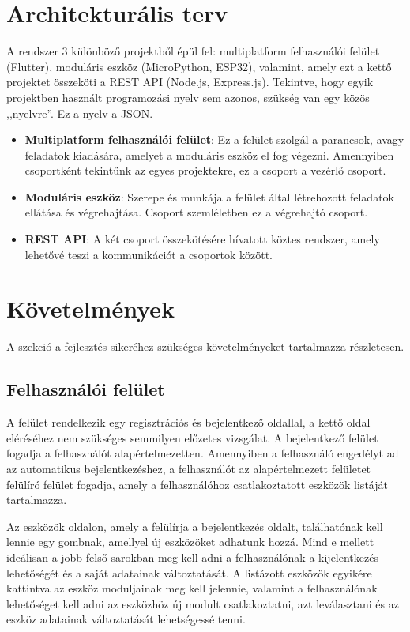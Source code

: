 \documentclass{thesis-ekf}
\theoremstyle{definition}
\theoremstyle{remark}
\begin{document}
	\section{Architekturális terv}
	A rendszer 3 különböző projektből épül fel: multiplatform felhasználói felület (Flutter), moduláris eszköz (MicroPython, ESP32), valamint, amely ezt a kettő projektet összeköti a REST API (Node.js, Express.js). Tekintve, hogy egyik projektben használt programozási nyelv sem azonos, szükség van egy közös ,,nyelvre''. Ez a nyelv a JSON.
	\begin{itemize}
		\item \textbf{Multiplatform felhasználói felület}: Ez a felület szolgál a parancsok, avagy feladatok kiadására, amelyet a moduláris eszköz el fog végezni. Amennyiben csoportként tekintünk az egyes projektekre, ez a csoport a vezérlő csoport.
		\item \textbf{Moduláris eszköz}: Szerepe és munkája a felület által létrehozott feladatok ellátása és végrehajtása. Csoport szemléletben ez a végrehajtó csoport.
		\item \textbf{REST API}: A két csoport összekötésére hívatott köztes rendszer, amely lehetővé teszi a kommunikációt a csoportok között.
	\end{itemize}
	\section{Követelmények}
	A szekció a fejlesztés sikeréhez szükséges követelményeket tartalmazza részletesen.
	\subsection{Felhasználói felület}
	A felület rendelkezik egy regisztrációs és bejelentkező oldallal, a kettő oldal eléréséhez nem szükséges semmilyen előzetes vizsgálat. A bejelentkező felület fogadja a felhasználót alapértelmezetten.
	Amennyiben a felhasználó engedélyt ad az automatikus bejelentkezéshez, a felhasználót az alapértelmezett felületet felülíró felület fogadja, amely a felhasználóhoz csatlakoztatott eszközök listáját tartalmazza.
	
	Az eszközök oldalon, amely a felülírja a bejelentkezés oldalt, találhatónak kell lennie egy gombnak, amellyel új eszközöket adhatunk hozzá. Mind e mellett ideálisan a jobb felső sarokban meg kell adni a felhasználónak a kijelentkezés lehetőségét és a saját adatainak változtatását. A listázott eszközök egyikére kattintva az eszköz moduljainak meg kell jelennie, valamint a felhasználónak lehetőséget kell adni az eszközhöz új modult csatlakoztatni, azt leválasztani és az eszköz adatainak változtatását lehetségessé tenni.
	
\end{document}
